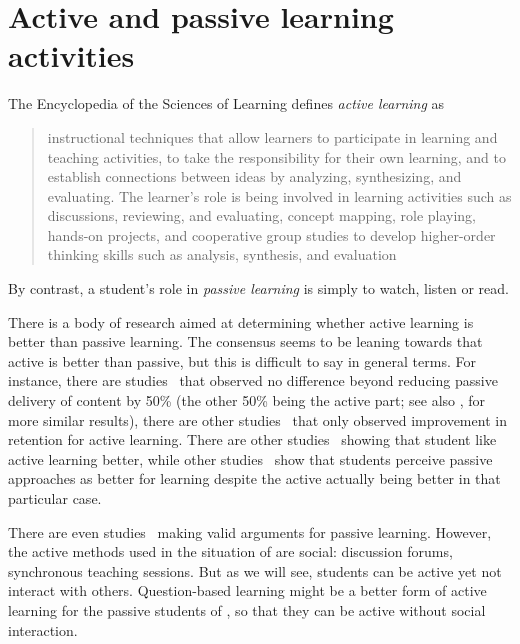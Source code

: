 
\section{Active and passive learning activities}

The Encyclopedia of the Sciences of Learning defines \emph{active learning} as 
\blockquote[{\cite[p.~77]{EncyclopediaActiveLearning}}][.]{%
  instructional techniques that allow learners to participate in learning and 
  teaching activities, to take the responsibility for their own learning, and 
  to establish connections between ideas by analyzing, synthesizing, and 
  evaluating.
  \textelp{}
  The learner’s role is being involved in learning activities such as 
  discussions, reviewing, and evaluating, concept mapping, role playing, 
  hands-on projects, and cooperative group studies to develop higher-order 
  thinking skills such as analysis, synthesis, and evaluation%
}
By contrast, a student's role in \emph{passive learning} is simply to watch, 
listen or read.

There is a body of research aimed at determining whether active learning is 
better than passive learning.
The consensus seems to be leaning towards that active is better than passive, 
but this is difficult to say in general terms.
For instance, there are studies~\parencite{ControlledTrialActiveVsPassive} that 
observed no difference beyond reducing passive delivery of content by 50\% (the 
other 50\% being the active part; see also \cite{BransfordSchwartz1999}, for 
more similar results), there are other studies~\parencite[see Table 
1 in][]{ActiveVsPassiveTeachingStyles} that only observed improvement in 
retention for active learning.
There are other studies~\parencite[see Table 1 in][]{ActiveVsPassiveTeachingStyles} showing that student like active learning 
better, while other studies~\parencite{ActualLearningVsFeeling} show that 
students perceive passive approaches as better for learning despite the active 
actually being better in that particular case.

There are even studies~\parencite{SmithSmith+2015+86+99} making valid arguments 
for passive learning.
However, the active methods used in the situation of 
\textcite{SmithSmith+2015+86+99} are social: discussion forums, synchronous 
teaching sessions.
But as we will see, students can be active yet not interact with others.
Question-based learning might be a better form of active learning for the 
passive students of \citeauthor{SmithSmith+2015+86+99}, so that they can be 
active without social interaction.

